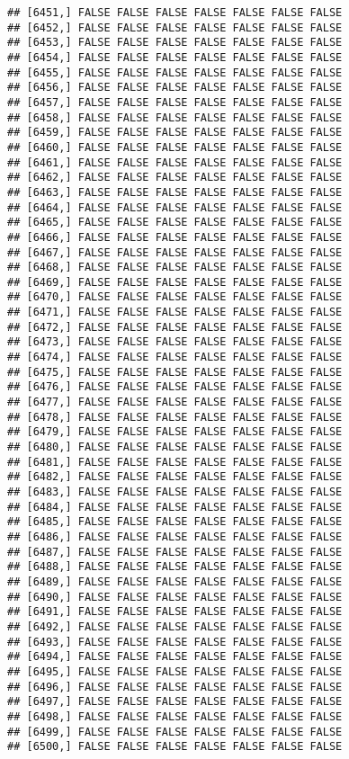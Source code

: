 \documentclass[
]{article}
\begin{document}
\begin{verbatim}
## [6451,] FALSE FALSE FALSE FALSE FALSE FALSE FALSE
## [6452,] FALSE FALSE FALSE FALSE FALSE FALSE FALSE
## [6453,] FALSE FALSE FALSE FALSE FALSE FALSE FALSE
## [6454,] FALSE FALSE FALSE FALSE FALSE FALSE FALSE
## [6455,] FALSE FALSE FALSE FALSE FALSE FALSE FALSE
## [6456,] FALSE FALSE FALSE FALSE FALSE FALSE FALSE
## [6457,] FALSE FALSE FALSE FALSE FALSE FALSE FALSE
## [6458,] FALSE FALSE FALSE FALSE FALSE FALSE FALSE
## [6459,] FALSE FALSE FALSE FALSE FALSE FALSE FALSE
## [6460,] FALSE FALSE FALSE FALSE FALSE FALSE FALSE
## [6461,] FALSE FALSE FALSE FALSE FALSE FALSE FALSE
## [6462,] FALSE FALSE FALSE FALSE FALSE FALSE FALSE
## [6463,] FALSE FALSE FALSE FALSE FALSE FALSE FALSE
## [6464,] FALSE FALSE FALSE FALSE FALSE FALSE FALSE
## [6465,] FALSE FALSE FALSE FALSE FALSE FALSE FALSE
## [6466,] FALSE FALSE FALSE FALSE FALSE FALSE FALSE
## [6467,] FALSE FALSE FALSE FALSE FALSE FALSE FALSE
## [6468,] FALSE FALSE FALSE FALSE FALSE FALSE FALSE
## [6469,] FALSE FALSE FALSE FALSE FALSE FALSE FALSE
## [6470,] FALSE FALSE FALSE FALSE FALSE FALSE FALSE
## [6471,] FALSE FALSE FALSE FALSE FALSE FALSE FALSE
## [6472,] FALSE FALSE FALSE FALSE FALSE FALSE FALSE
## [6473,] FALSE FALSE FALSE FALSE FALSE FALSE FALSE
## [6474,] FALSE FALSE FALSE FALSE FALSE FALSE FALSE
## [6475,] FALSE FALSE FALSE FALSE FALSE FALSE FALSE
## [6476,] FALSE FALSE FALSE FALSE FALSE FALSE FALSE
## [6477,] FALSE FALSE FALSE FALSE FALSE FALSE FALSE
## [6478,] FALSE FALSE FALSE FALSE FALSE FALSE FALSE
## [6479,] FALSE FALSE FALSE FALSE FALSE FALSE FALSE
## [6480,] FALSE FALSE FALSE FALSE FALSE FALSE FALSE
## [6481,] FALSE FALSE FALSE FALSE FALSE FALSE FALSE
## [6482,] FALSE FALSE FALSE FALSE FALSE FALSE FALSE
## [6483,] FALSE FALSE FALSE FALSE FALSE FALSE FALSE
## [6484,] FALSE FALSE FALSE FALSE FALSE FALSE FALSE
## [6485,] FALSE FALSE FALSE FALSE FALSE FALSE FALSE
## [6486,] FALSE FALSE FALSE FALSE FALSE FALSE FALSE
## [6487,] FALSE FALSE FALSE FALSE FALSE FALSE FALSE
## [6488,] FALSE FALSE FALSE FALSE FALSE FALSE FALSE
## [6489,] FALSE FALSE FALSE FALSE FALSE FALSE FALSE
## [6490,] FALSE FALSE FALSE FALSE FALSE FALSE FALSE
## [6491,] FALSE FALSE FALSE FALSE FALSE FALSE FALSE
## [6492,] FALSE FALSE FALSE FALSE FALSE FALSE FALSE
## [6493,] FALSE FALSE FALSE FALSE FALSE FALSE FALSE
## [6494,] FALSE FALSE FALSE FALSE FALSE FALSE FALSE
## [6495,] FALSE FALSE FALSE FALSE FALSE FALSE FALSE
## [6496,] FALSE FALSE FALSE FALSE FALSE FALSE FALSE
## [6497,] FALSE FALSE FALSE FALSE FALSE FALSE FALSE
## [6498,] FALSE FALSE FALSE FALSE FALSE FALSE FALSE
## [6499,] FALSE FALSE FALSE FALSE FALSE FALSE FALSE
## [6500,] FALSE FALSE FALSE FALSE FALSE FALSE FALSE

\end{verbatim}
\end{document}
